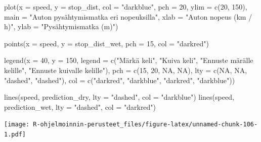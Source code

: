 \documentclass[
]{book}
\newenvironment{Shaded}{\begin{snugshade}}{\end{snugshade}}
\newcommand{\AttributeTok}[1]{\textcolor[rgb]{0.77,0.63,0.00}{#1}}
\newcommand{\ConstantTok}[1]{\textcolor[rgb]{0.00,0.00,0.00}{#1}}
\newcommand{\DecValTok}[1]{\textcolor[rgb]{0.00,0.00,0.81}{#1}}
\newcommand{\FunctionTok}[1]{\textcolor[rgb]{0.00,0.00,0.00}{#1}}
\newcommand{\NormalTok}[1]{#1}
\newcommand{\StringTok}[1]{\textcolor[rgb]{0.31,0.60,0.02}{#1}}
\begin{document}
\begin{Shaded}
\begin{Highlighting}[]
\FunctionTok{plot}\NormalTok{(}\AttributeTok{x =}\NormalTok{ speed, }\AttributeTok{y =}\NormalTok{ stop\_dist,}
     \AttributeTok{col =} \StringTok{"darkblue"}\NormalTok{, }\AttributeTok{pch =} \DecValTok{20}\NormalTok{,}
     \AttributeTok{ylim =} \FunctionTok{c}\NormalTok{(}\DecValTok{20}\NormalTok{, }\DecValTok{150}\NormalTok{),}
     \AttributeTok{main =} \StringTok{"Auton pysähtymismatka eri nopeuksilla"}\NormalTok{,}
     \AttributeTok{xlab =} \StringTok{"Auton nopeus (km / h)"}\NormalTok{, }\AttributeTok{ylab =} \StringTok{"Pysähtymismatka (m)"}\NormalTok{)}

\FunctionTok{points}\NormalTok{(}\AttributeTok{x =}\NormalTok{ speed, }\AttributeTok{y =}\NormalTok{ stop\_dist\_wet, }\AttributeTok{pch =} \DecValTok{15}\NormalTok{, }\AttributeTok{col =} \StringTok{"darkred"}\NormalTok{)}

\FunctionTok{legend}\NormalTok{(}\AttributeTok{x =} \DecValTok{40}\NormalTok{, }\AttributeTok{y =} \DecValTok{150}\NormalTok{,}
       \AttributeTok{legend =} \FunctionTok{c}\NormalTok{(}\StringTok{"Märkä keli"}\NormalTok{, }\StringTok{"Kuiva keli"}\NormalTok{,}
                  \StringTok{"Ennuste märälle kelille"}\NormalTok{,}
                  \StringTok{"Ennuste kuivalle kelille"}\NormalTok{),}
       \AttributeTok{pch =} \FunctionTok{c}\NormalTok{(}\DecValTok{15}\NormalTok{, }\DecValTok{20}\NormalTok{, }\ConstantTok{NA}\NormalTok{, }\ConstantTok{NA}\NormalTok{),}
       \AttributeTok{lty =} \FunctionTok{c}\NormalTok{(}\ConstantTok{NA}\NormalTok{, }\ConstantTok{NA}\NormalTok{, }\StringTok{"dashed"}\NormalTok{, }\StringTok{"dashed"}\NormalTok{),}
       \AttributeTok{col =} \FunctionTok{c}\NormalTok{(}\StringTok{"darkred"}\NormalTok{, }\StringTok{"darkblue"}\NormalTok{, }\StringTok{"darkred"}\NormalTok{, }\StringTok{"darkblue"}\NormalTok{))}

\FunctionTok{lines}\NormalTok{(speed, prediction\_dry, }\AttributeTok{lty =} \StringTok{"dashed"}\NormalTok{, }\AttributeTok{col =} \StringTok{"darkblue"}\NormalTok{)}
\FunctionTok{lines}\NormalTok{(speed, prediction\_wet, }\AttributeTok{lty =} \StringTok{"dashed"}\NormalTok{, }\AttributeTok{col =} \StringTok{"darkred"}\NormalTok{)}
\end{Highlighting}
\end{Shaded}

\texttt{[image: R-ohjelmoinnin-perusteet\_files/figure-latex/unnamed-chunk-106-1.pdf]}
\end{document}

